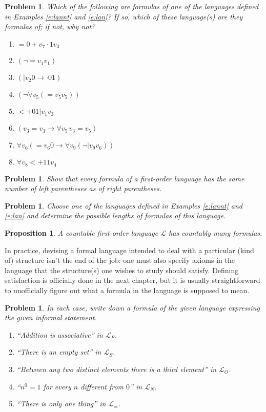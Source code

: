 \documentclass[12pt]{amsbook}
\theoremstyle{plain}
\newtheorem{prop}[thm]{Proposition}
\newtheorem{prob}[thm]{Problem}
\theoremstyle{definition}
\theoremstyle{remark}
\begin{document}
\begin{prob} \label{p:five4}
Which of the following are formulas of one of the languages defined in Examples \ref{e:lannt} and \ref{e:lan}?  If so,  which of these language(s) are they formulas of;  if not,  why not?
\begin{enumerate}
\item $= 0 + v_7 \cdot 1 v_3$
\item $(\lnot = v_1 v_1)$
\item $(| v_2 0 \to \cdot 0 1)$
\item $(\lnot \forall v_5 (= v_5 v_5))$
\item $< +01 |v_1v_3$
\item $(v_3 = v_3 \to \forall v_5 \, v_3 = v_5)$
\item $\forall v_6 (= v_6 0 \to \forall v_9 (\lnot | v_9 v_6))$ 
\item $\forall v_8 < +11 v_4$
\end{enumerate}
\end{prob}

\begin{prob} \label{p:five5}
Show that every formula of a first-order language has the same number of left parentheses as of right parentheses.
\end{prob}

\begin{prob} \label{p:five6}
Choose one of the languages defined in Examples \ref{e:lannt} and \ref{e:lan} and determine the possible lengths of formulas of this language.
\end{prob}

\begin{prop} \label{p:five7}
A countable first-order language $\mathcal{L}$ has countably many formulas.
\end{prop}


In practice,  devising a formal language intended to deal with a particular (kind of) structure isn't the end of the job:  one must also specify axioms in the language that the structure(s) one wishes to study should satisfy.  Defining satisfaction is officially done in the next chapter,  but it is usually straightforward to unofficially figure out what a formula in the language is supposed to mean. 

\begin{prob} \label{p:for}
In each case,  write down a formula of the given language expressing the given informal statement.
\begin{enumerate}
\item ``Addition is associative'' in $\mathcal{L}_F$.
\item ``There is an empty set'' in $\mathcal{L}_S$.
\item ``Between any two distinct elements there is a third element'' in $\mathcal{L}_O$.
\item ``$n^0 = 1$ for every $n$ different from $0$'' in $\mathcal{L}_N$.
\item ``There is only one thing'' in $\mathcal{L}_=$.
\end{enumerate}
\end{prob}
\end{document}
